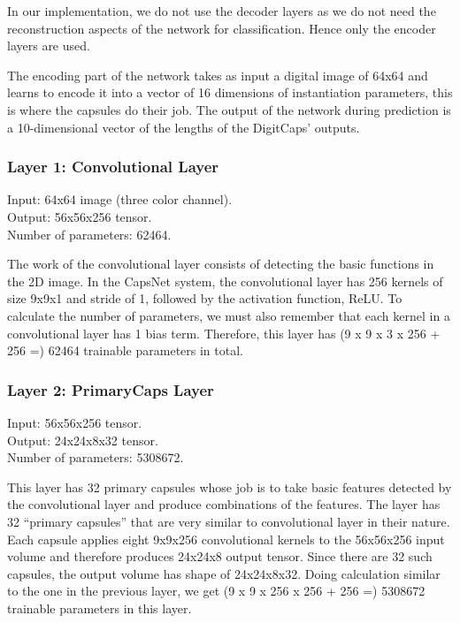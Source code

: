 \documentclass{vldb}
\begin{document}
In our implementation, we do not use the decoder layers as we do not need the reconstruction aspects of the network for classification. Hence only the encoder layers are used.
\par\bigskip
The encoding part of the network takes as input a digital image of 64x64 and learns to encode it into a vector of 16 dimensions of instantiation parameters, this is where the capsules do their job. The output of the network during prediction is a 10-dimensional vector of the lengths of the DigitCaps' outputs.


\subsubsection{Layer 1: Convolutional Layer} %
\label{sub:layer_1_convolutional_layer}
\noindent Input: 64x64 image (three color channel).
\\Output: 56x56x256 tensor.
\\Number of parameters: 62464.

\par\bigskip The work of the convolutional layer consists of detecting the basic functions in the 2D image. In the CapsNet system, the convolutional layer has 256 kernels of size 9x9x1 and stride of 1, followed by the activation function, ReLU. To calculate the number of parameters, we must also remember that each kernel in a convolutional layer has 1 bias term. Therefore, this layer has (9 x 9 x 3 x 256 + 256 =) 62464 trainable parameters in total.


\subsubsection{Layer 2: PrimaryCaps Layer} %
\label{sub:layer_2_primarycaps_layer}
\noindent Input: 56x56x256 tensor.
\\Output: 24x24x8x32 tensor.
\\Number of parameters: 5308672.

\par This layer has 32 primary capsules whose job is to take basic features detected by the convolutional layer and produce combinations of the features. The layer has 32 “primary capsules” that are very similar to convolutional layer in their nature. Each capsule applies eight 9x9x256 convolutional kernels to the 56x56x256 input volume and therefore produces 24x24x8 output tensor. Since there are 32 such capsules, the output volume has shape of 24x24x8x32. Doing calculation similar to the one in the previous layer, we get (9 x 9 x 256 x 256 + 256 =) 5308672 trainable parameters in this layer.
\end{document}
